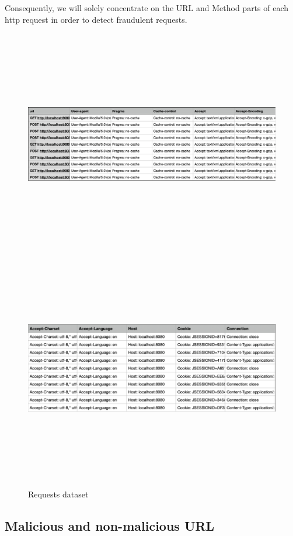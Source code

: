 Consequently, we will solely concentrate on the URL and Method parts of each http request in order to detect fraudulent requests.

\begin{figure}[!h]
	\centering
	\includegraphics[width=\linewidth, height=10cm,keepaspectratio]{figures/dataset part1.PNG}
	\includegraphics[width=\linewidth, height=10cm,keepaspectratio]{figures/dataset part2.PNG}
  \caption{Requests dataset}
\end{figure}

\newpage
\subsection{Malicious and non-malicious URL}

